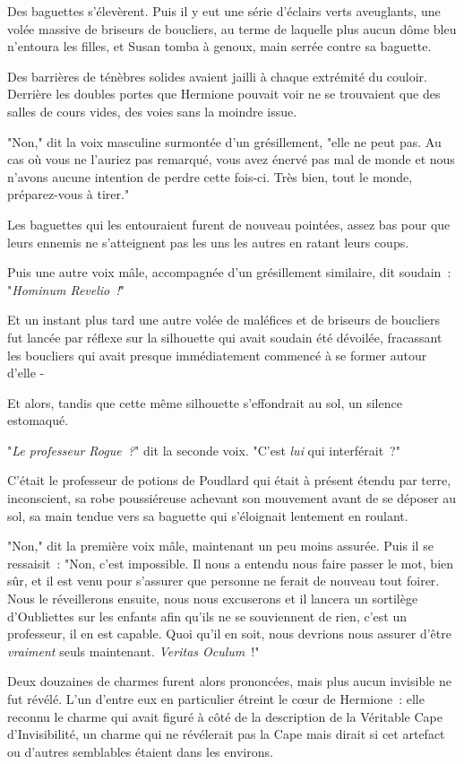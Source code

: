 Des baguettes s'élevèrent. Puis il y eut une série d'éclairs verts aveuglants, une volée massive de briseurs de boucliers, au terme de laquelle plus aucun dôme bleu n'entoura les filles, et Susan tomba à genoux, main serrée contre sa baguette.

Des barrières de ténèbres solides avaient jailli à chaque extrémité du couloir. Derrière les doubles portes que Hermione pouvait voir ne se trouvaient que des salles de cours vides, des voies sans la moindre issue.

"Non," dit la voix masculine surmontée d'un grésillement, "elle ne peut pas. Au cas où vous ne l'auriez pas remarqué, vous avez énervé pas mal de monde et nous n'avons aucune intention de perdre cette fois-ci. Très bien, tout le monde, préparez-vous à tirer."

Les baguettes qui les entouraient furent de nouveau pointées, assez bas pour que leurs ennemis ne s'atteignent pas les uns les autres en ratant leurs coups.

Puis une autre voix mâle, accompagnée d'un grésillement similaire, dit soudain~: "\emph{Hominum Revelio~!}"

Et un instant plus tard une autre volée de maléfices et de briseurs de boucliers fut lancée par réflexe sur la silhouette qui avait soudain été dévoilée, fracassant les boucliers qui avait presque immédiatement commencé à se former autour d'elle -

Et alors, tandis que cette même silhouette s'effondrait au sol, un silence estomaqué.

"\emph{Le professeur Rogue~?}" dit la seconde voix. "C'est \emph{lui} qui interférait~?"

C'était le professeur de potions de Poudlard qui était à présent étendu par terre, inconscient, sa robe poussiéreuse achevant son mouvement avant de se déposer au sol, sa main tendue vers sa baguette qui s'éloignait lentement en roulant.

"Non," dit la première voix mâle, maintenant un peu moins assurée. Puis il se ressaisit~: "Non, c'est impossible. Il nous a entendu nous faire passer le mot, bien sûr, et il est venu pour s'assurer que personne ne ferait de nouveau tout foirer. Nous le réveillerons ensuite, nous nous excuserons et il lancera un sortilège d'Oubliettes sur les enfants afin qu'ils ne se souviennent de rien, c'est un professeur, il en est capable. Quoi qu'il en soit, nous devrions nous assurer d'être \emph{vraiment} seuls maintenant. \emph{Veritas Oculum}~!"

Deux douzaines de charmes furent alors prononcées, mais plus aucun invisible ne fut révélé. L'un d'entre eux en particulier étreint le cœur de Hermione~: elle reconnu le charme qui avait figuré à côté de la description de la Véritable Cape d'Invisibilité, un charme qui ne révélerait pas la Cape mais dirait si cet artefact ou d'autres semblables étaient dans les environs.

